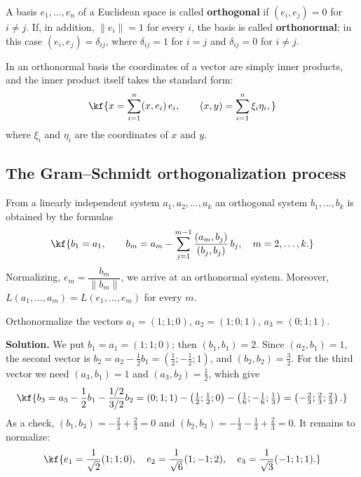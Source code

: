 
\begin{tarif}
A basis $e_1,\dots,e_n$ of a Euclidean space is called \textbf{orthogonal} if
$(e_i,e_j)=0$ for $i\neq j$. If, in addition, $\|e_i\|=1$ for every $i$, the
basis is called \textbf{orthonormal}; in this case
$(e_i,e_j)=\delta_{ij}$, where $\delta_{ij}=1$ for $i=j$ and $\delta_{ij}=0$ for $i\neq j$.
\end{tarif}

In an orthonormal basis the coordinates of a vector are simply inner products,
and the inner product itself takes the standard form:
\[\kf{x=\sum_{i=1}^n(x,e_i)\,e_i,\qquad (x,y)=\sum_{i=1}^n\xi_i\eta_i ,}\]
where $\xi_i$ and $\eta_i$ are the coordinates of $x$ and $y$.

\subsection{The Gram–Schmidt orthogonalization process}

\begin{teorema}
From a linearly independent system $a_1,a_2,\dots,a_k$ an orthogonal system
$b_1,\dots,b_k$ is obtained by the formulas
\[\kf{b_1=a_1,\qquad
b_m=a_m-\sum_{j=1}^{m-1}\frac{(a_m,b_j)}{(b_j,b_j)}\,b_j,\quad m=2,\dots,k.}\]
Normalizing, $e_m=\dfrac{b_m}{\|b_m\|}$, we arrive at an orthonormal system.
Moreover, $L(a_1,\dots,a_m)=L(e_1,\dots,e_m)$ for every $m$.
\end{teorema}

\begin{misol}
Orthonormalize the vectors $a_1=(1;1;0)$, $a_2=(1;0;1)$, $a_3=(0;1;1)$.

\textbf{Solution.} We put $b_1=a_1=(1;1;0)$; then $(b_1,b_1)=2$.
Since $(a_2,b_1)=1$, the second vector is
$b_2=a_2-\frac12b_1=\left(\frac12;-\frac12;1\right)$, and $(b_2,b_2)=\frac32$.
For the third vector we need $(a_3,b_1)=1$ and $(a_3,b_2)=\frac12$, which give
\[\kf{b_3=a_3-\frac12b_1-\frac{1/2}{3/2}b_2
=(0;1;1)-\left(\tfrac12;\tfrac12;0\right)-\left(\tfrac16;-\tfrac16;\tfrac13\right)
=\left(-\tfrac23;\tfrac23;\tfrac23\right).}\]
As a check, $(b_1,b_3)=-\frac23+\frac23=0$ and $(b_2,b_3)=-\frac13-\frac13+\frac23=0$.
It remains to normalize:
\[\kf{e_1=\frac{1}{\sqrt2}(1;1;0),\quad
e_2=\frac{1}{\sqrt6}(1;-1;2),\quad
e_3=\frac{1}{\sqrt3}(-1;1;1).}\]
\end{misol}

